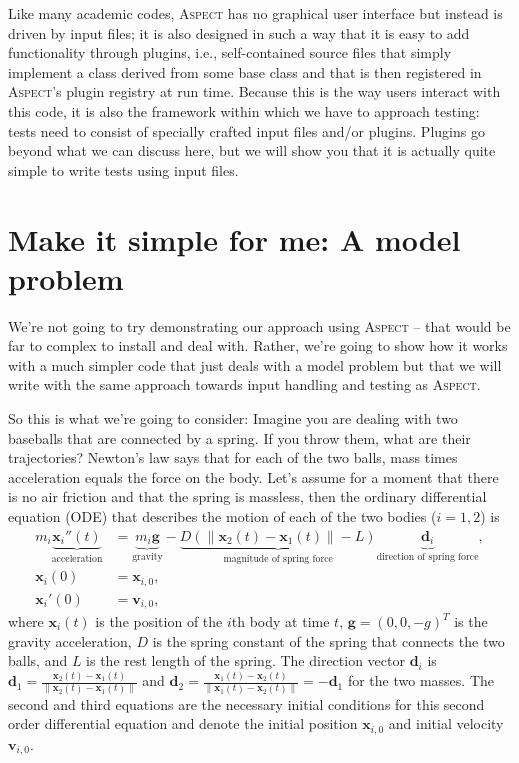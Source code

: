 \documentclass{article}
\newcommand{\aspect}{\textsc{Aspect}}
\begin{document}
Like many academic codes, \aspect{} has no graphical user interface but
instead is driven by input files; it is also designed in such a way that it is
easy to add functionality through plugins, i.e., self-contained source files
that simply implement a class derived from some base class and that is then
registered in \aspect{}'s plugin registry at run time. Because this is the way
users interact with this code, it is also the framework within which we have
to approach testing: tests need to consist of specially crafted input files
and/or plugins. Plugins go beyond what we can discuss here, but we will show
you that it is actually quite simple to write tests using input files.


\section{Make it simple for me: A model problem}
\label{sec:model-problem}

We're not going to try demonstrating our approach using \aspect{} -- that
would be far to complex to install and deal with. Rather, we're going to show
how it works with a much simpler code that just deals with a model problem but
that we will write with the same approach towards input handling and testing
as \aspect{}.

So this is what we're going to consider: Imagine you are dealing with two
baseballs that
are connected by a spring. If you throw them, what are their trajectories?
Newton's law says that for each of the two balls, mass times acceleration
equals the force on the body. Let's assume for a moment that there is no air
friction and that the spring is massless, then the ordinary differential
equation (ODE) that describes the motion of each of the two bodies ($i=1,2$) is
\begin{align}
  \label{eq:ode}
  m_i 
  \underbrace{\mathbf x_i''(t)}_{\text{acceleration}}
  &=
  \underbrace{m_i \mathbf g}_{\text{gravity}}
  -
  \underbrace{D (\|\mathbf x_2(t) - \mathbf x_1(t)\| - L)}_{\text{magnitude of
    spring force}}
\underbrace{\mathbf d_i}_{\text{direction of spring force}},
\\
\label{eq:ic1}
  \mathbf x_i(0) &= \mathbf x_{i,0},
\\
\label{eq:ic2}
  \mathbf x_i'(0) &= \mathbf v_{i,0},
\end{align}
where $\mathbf x_i(t)$ is the position of the $i$th body at time $t$, $\mathbf
g=(0,0,-g)^T$ is the gravity acceleration, $D$ is the spring constant of
the spring that connects the two balls, and $L$ is the rest length of the
spring. The direction vector $\mathbf d_i$ is
$\mathbf d_1 = \frac{\mathbf x_2(t) - \mathbf x_1(t)}{\|\mathbf x_2(t) - \mathbf
    x_1(t)\|}$
and
$\mathbf d_2 = \frac{\mathbf x_1(t) - \mathbf x_2(t)}{\|\mathbf x_1(t) - \mathbf
    x_2(t)\|}=-\mathbf d_1$ for the two masses.
The second and third equations are the necessary initial conditions
for this second order differential equation and denote the initial position
$\mathbf x_{i,0}$ and initial velocity $\mathbf v_{i,0}$.
\end{document}
